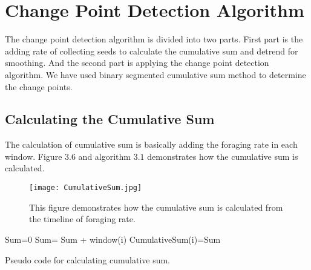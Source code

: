 \section{\label{section:Change Point Detection Algorithm}Change Point Detection Algorithm}
 The change point detection algorithm is divided into two parts. First part is the adding rate of collecting seeds to calculate the cumulative sum and detrend for smoothing. And the second part is applying the change point detection algorithm. We have used binary segmented cumulative sum method to determine the change points.
 \subsection{\label{Calculating the Cumulative Sum}Calculating the Cumulative Sum}
 The calculation of cumulative sum is basically adding the foraging rate in each window. Figure $3.6$ and algorithm $3.1$ demonstrates how the cumulative sum is calculated.\par
 \begin{figure}[h]
 	\texttt{[image: CumulativeSum.jpg]}
 	\caption{This figure demonstrates how the cumulative sum is calculated from the timeline of foraging rate.}
 \end{figure}

 \begin{algorithm}[H]
 	\begin{algorithmic}[1]
 		\State Sum=0
 			\State Sum= Sum + window(i)
 			\State CumulativeSum(i)=Sum
 		\EndFor
 		\caption{Pseudo code for calculating cumulative sum.}
 		\label{Pseudo code for calculating cumulative sum.}
 	\end{algorithmic}
 \end{algorithm}
 
